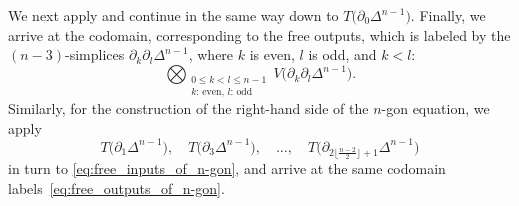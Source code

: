 \documentclass[pdftex]{sigma}
\numberwithin{equation}{section}
\theoremstyle{definition}
\begin{document}
We next apply  and continue in the same way down to $T\bigl(\partial_0\Delta^{n-1}\bigr)$. Finally, we arrive at the codomain, corresponding to the free outputs, which is labeled by the $(n-3)$-simplices $\partial_k\partial_l\Delta^{n-1}$, where $k$ is even, $l$ is odd, and $k<l$:
\begin{equation}\label{eq:free_outputs_of_n-gon}
 \bigotimes_{\substack{0\leq k<l\leq n-1\\\text{$k$: even, $l$: odd}}} V\bigl(\partial_k\partial_l\Delta^{n-1}\bigr).
\end{equation}
Similarly, for the construction of the right-hand side of the $n$-gon equation, we apply
\[
T\bigl(\partial_1\Delta^{n-1}\bigr),\quad T\bigl(\partial_3\Delta^{n-1}\bigr),\quad \dots,\quad T\bigl(\partial_{2\lfloor\frac{n-2}{2}\rfloor+1}\Delta^{n-1}\bigr)
\]
in turn to \eqref{eq:free_inputs_of_n-gon}, and arrive at the same codomain labels~\eqref{eq:free_outputs_of_n-gon}.
\end{document}
